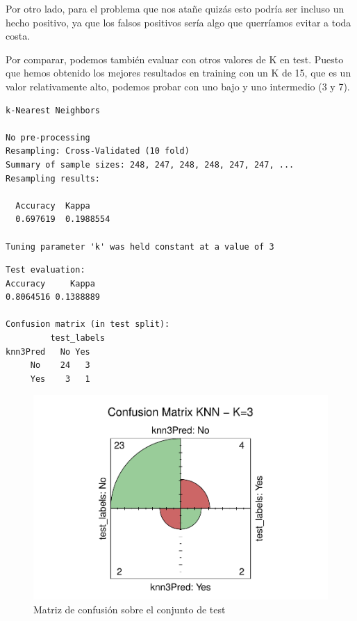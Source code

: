 Por otro lado, para el problema que nos atañe quizás esto podría ser incluso un hecho positivo, ya que los falsos positivos sería algo que querríamos evitar a toda costa.

\vspace{\baselineskip}

Por comparar, podemos también evaluar con otros valores de K en test. Puesto que hemos obtenido los mejores resultados en training con un K de 15, que es un valor relativamente alto, podemos probar con uno bajo y uno intermedio (3 y 7).

\begin{verbatim}
k-Nearest Neighbors

No pre-processing
Resampling: Cross-Validated (10 fold) 
Summary of sample sizes: 248, 247, 248, 248, 247, 247, ... 
Resampling results:

  Accuracy  Kappa    
  0.697619  0.1988554

Tuning parameter 'k' was held constant at a value of 3
\end{verbatim}

\begin{verbatim}
Test evaluation:
Accuracy     Kappa 
0.8064516 0.1388889

Confusion matrix (in test split):
         test_labels
knn3Pred   No Yes
     No    24   3
     Yes    3   1
\end{verbatim}

\begin{figure}[H]\center\includegraphics[width=.9\linewidth]{img/Clasificacion_files/figure-latex/unnamed-chunk-12-1}\caption{Matriz de confusión sobre el conjunto de test}\end{figure}

\newpage

